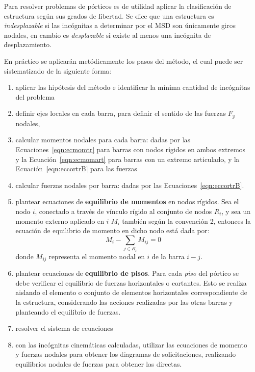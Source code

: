 Para resolver problemas de pórticos es de utilidad aplicar la clasificación de estructura según sus grados de libertad. Se dice que una estructura es \textit{indesplazable} si las incógnitas a determinar por el MSD son únicamente giros nodales, en cambio es \textit{desplazable} si existe al menos una incógnita de desplazamiento. %
%

En práctico se aplicarán metódicamente los pasos del método, el cual puede ser sistematizado de la siguiente forma:
%
\begin{enumerate}
	\item aplicar las hipótesis del método e identificar la mínima cantidad de incógnitas del problema
	\item definir ejes locales en cada barra, para definir el sentido de las fuerzas $F_y$ nodales,
	\item calcular momentos nodales para cada barra: dadas por las Ecuaciones~\eqref{eqn:ecmomtr} para barras con nodos rígidos en ambos extremos y la Ecuación~\eqref{eqn:ecmomart} para barras con un extremo articulado, y la Ecuación~\eqref{eqn:eccortrB} para las fuerzas
	\item calcular fuerzas nodales por barra: dadas por las Ecuaciones~\eqref{eqn:eccortrB}.
	\item plantear ecuaciones de \textbf{equilibrio de momentos} en nodos rígidos. Sea el nodo $i$, conectado a través de vínculo rígido al conjunto de nodos $R_i$, y sea un momento externo aplicado en $i$ $M_i$ también según la convención 2, entonces la ecuación de equilibrio de momento en dicho nodo está dada por:
	$$
	M_i -\sum_{j\in R_i} M_{ij} = 0
	$$
	donde $M_{ij}$ representa el momento nodal en $i$ de la barra $i-j$.
	
	\item plantear ecuaciones de \textbf{equilibrio de pisos}. Para cada \textit{piso} del pórtico se debe verificar el equilibrio de fuerzas horizontales o cortantes. Esto se realiza aislando el elemento o conjunto de elementos horizontales correspondiente de la estructura, considerando las acciones realizadas por las otras barras y planteando el equilibrio de fuerzas.
	
	\item resolver el sistema de ecuaciones
	\item con las incógnitas cinemáticas calculadas, utilizar las ecuaciones de momento y fuerzas nodales para obtener los diagramas de solicitaciones, realizando equilibrios nodales de fuerzas para obtener las directas.
	
\end{enumerate}


